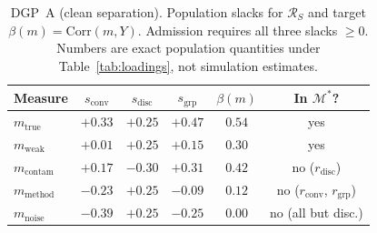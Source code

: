 \documentclass[10pt,letterpaper]{article}
\newcommand{\M}{\ensuremath{\mathcal{M}}}
\newcommand{\Rset}{\mathcal{R}}
\begin{document}
\begin{table}[t]
\centering
\small
\caption{DGP~A (clean separation).
Population slacks for $\Rset_S$ and target $\beta(m)=\mathrm{Corr}(m,Y)$.
Admission requires all three slacks $\ge 0$.
Numbers are exact population quantities under Table~\ref{tab:loadings}, not simulation estimates.}
\label{tab:dgpa}
\begin{tabular}{@{}lccccc@{}}
\toprule
Measure & $s_{\mathrm{conv}}$ & $s_{\mathrm{disc}}$ & $s_{\mathrm{grp}}$ & $\beta(m)$ & In $\M^*$? \\
\midrule
$m_{\mathrm{true}}$   & $+0.33$ & $+0.25$ & $+0.47$ & $0.54$ & yes \\
$m_{\mathrm{weak}}$   & $+0.01$ & $+0.25$ & $+0.15$ & $0.30$ & yes \\
$m_{\mathrm{contam}}$ & $+0.17$ & $-0.30$ & $+0.31$ & $0.42$ & no ($r_{\mathrm{disc}}$) \\
$m_{\mathrm{method}}$ & $-0.23$ & $+0.25$ & $-0.09$ & $0.12$ & no ($r_{\mathrm{conv}}$, $r_{\mathrm{grp}}$) \\
$m_{\mathrm{noise}}$  & $-0.39$ & $+0.25$ & $-0.25$ & $0.00$ & no (all but disc.) \\
\bottomrule
\end{tabular}
\end{table}
\end{document}
